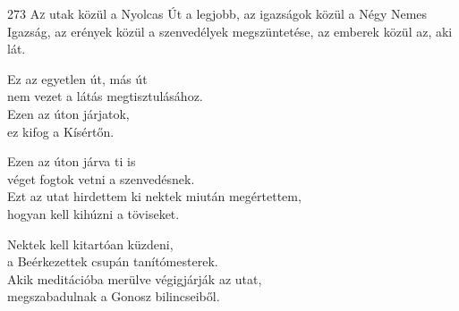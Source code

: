 
\begin{firstdhpverse}{273}
\lettrine[slope=0.5em]{A}{z} {\LettrineTextFont utak közül a Nyolcas Út a legjobb,}\newline
az igazságok közül a Négy Nemes Igazság,\newline
az erények közül a szenvedélyek megszüntetése,\newline
az emberek közül az, aki lát.
\end{firstdhpverse}

\begin{dhpverse}

 Ez az egyetlen út, más út\\
nem vezet a látás megtisztulásához.\\
Ezen az úton járjatok,\\
ez kifog a Kísértőn.

 Ezen az úton járva ti is\\
véget fogtok vetni a szenvedésnek.\\
Ezt az utat hirdettem ki nektek miután megértettem,\\
hogyan kell kihúzni a töviseket.

 Nektek kell kitartóan küzdeni,\\
a Beérkezettek csupán tanítómesterek.\\
Akik meditációba merülve végigjárják az utat,\\
megszabadulnak a Gonosz bilincseiből.

\end{dhpverse}
\newpage
